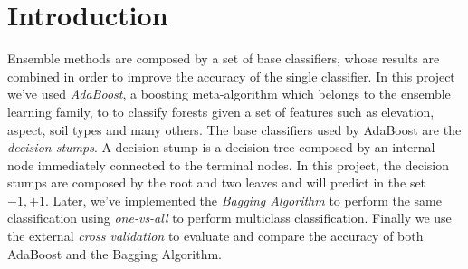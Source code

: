 \chapter{Introduction}
Ensemble methods are composed by a set of base classifiers, whose results are combined in order to improve the accuracy of the single classifier. In this project we've used \textit{AdaBoost}, a boosting meta-algorithm which belongs to the ensemble learning family, to to classify forests given a set of features such as elevation, aspect, soil types and many others. The base classifiers used by AdaBoost are the \textit{decision stumps}. A decision stump is a decision tree composed by an internal node immediately connected to the terminal nodes. In this project, the decision stumps are composed by the root and two leaves and will predict in the set ${-1, +1}$. Later, we've implemented the \textit{Bagging Algorithm} to perform the same classification using \textit{one-vs-all} to perform multiclass classification. Finally we use the external \textit{cross validation} to evaluate and compare the accuracy of both AdaBoost and the Bagging Algorithm.
